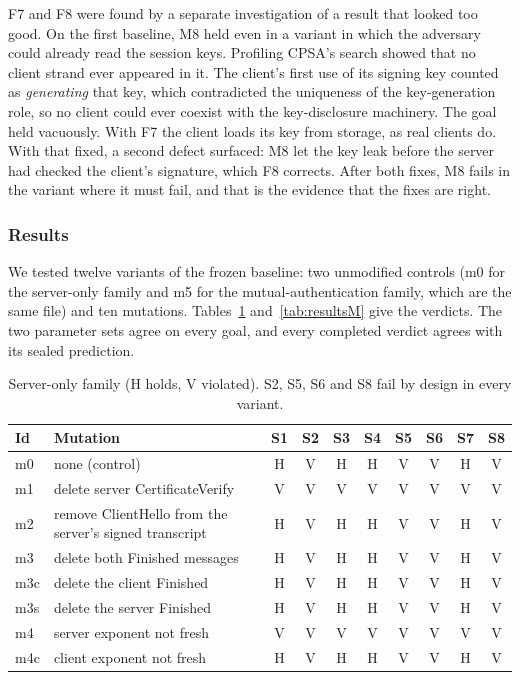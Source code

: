 \documentclass[11pt]{article}
\begin{document}
F7 and F8 were found by a separate investigation of a result that looked too good. On the first baseline, M8 held even in a variant in which the adversary could already read the session keys. Profiling CPSA's search showed that no client strand ever appeared in it. The client's first use of its signing key counted as \textit{generating} that key, which contradicted the uniqueness of the key-generation role, so no client could ever coexist with the key-disclosure machinery. The goal held vacuously. With F7 the client loads its key from storage, as real clients do. With that fixed, a second defect surfaced: M8 let the key leak before the server had checked the client's signature, which F8 corrects. After both fixes, M8 fails in the variant where it must fail, and that is the evidence that the fixes are right.

\subsubsection{Results}
We tested twelve variants of the frozen baseline: two unmodified controls (m0 for the server-only family and m5 for the mutual-authentication family, which are the same file) and ten mutations. Tables~\ref{tab:resultsS} and~\ref{tab:resultsM} give the verdicts. The two parameter sets agree on every goal, and every completed verdict agrees with its sealed prediction.

\begin{table}[h!]
\centering
\small
\begin{tabular}{|l|p{6.2cm}|c|c|c|c|c|c|c|c|}
\hline
\textbf{Id} & \textbf{Mutation} & S1 & S2 & S3 & S4 & S5 & S6 & S7 & S8 \\
\hline
m0 & none (control) & H & V & H & H & V & V & H & V \\
m1 & delete server CertificateVerify & V & V & V & V & V & V & V & V \\
m2 & remove ClientHello from the server's signed transcript & H & V & H & H & V & V & H & V \\
m3 & delete both Finished messages & H & V & H & H & V & V & H & V \\
m3c & delete the client Finished & H & V & H & H & V & V & H & V \\
m3s & delete the server Finished & H & V & H & H & V & V & H & V \\
m4 & server exponent not fresh & V & V & V & V & V & V & V & V \\
m4c & client exponent not fresh & H & V & H & H & V & V & H & V \\
\hline
\end{tabular}
\caption{Server-only family (H holds, V violated). S2, S5, S6 and S8 fail by design in every variant.}
\label{tab:resultsS}
\end{table}
\end{document}
